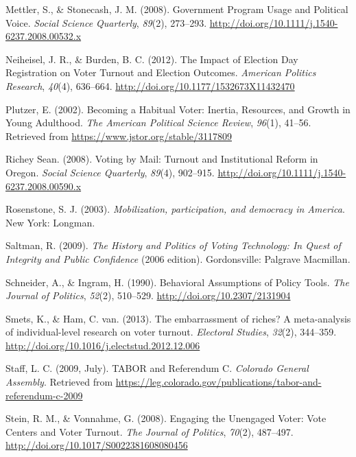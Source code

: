 \documentclass[12pt,twoside]{reedthesis}
\begin{document}
  \hypertarget{ref-mettler_government_2008}{}
  Mettler, S., \& Stonecash, J. M. (2008). Government Program Usage and
  Political Voice. \emph{Social Science Quarterly}, \emph{89}(2),
  273--293. \url{http://doi.org/10.1111/j.1540-6237.2008.00532.x}
  
  \hypertarget{ref-neiheisel_impact_2012}{}
  Neiheisel, J. R., \& Burden, B. C. (2012). The Impact of Election Day
  Registration on Voter Turnout and Election Outcomes. \emph{American
  Politics Research}, \emph{40}(4), 636--664.
  \url{http://doi.org/10.1177/1532673X11432470}
  
  \hypertarget{ref-plutzer_becoming_2002}{}
  Plutzer, E. (2002). Becoming a Habitual Voter: Inertia, Resources, and
  Growth in Young Adulthood. \emph{The American Political Science Review},
  \emph{96}(1), 41--56. Retrieved from
  \url{https://www.jstor.org/stable/3117809}
  
  \hypertarget{ref-richey_sean_voting_2008}{}
  Richey Sean. (2008). Voting by Mail: Turnout and Institutional Reform in
  Oregon. \emph{Social Science Quarterly}, \emph{89}(4), 902--915.
  \url{http://doi.org/10.1111/j.1540-6237.2008.00590.x}
  
  \hypertarget{ref-rosenstone_mobilization_2003}{}
  Rosenstone, S. J. (2003). \emph{Mobilization, participation, and
  democracy in America}. New York: Longman.
  
  \hypertarget{ref-saltman_history_2009}{}
  Saltman, R. (2009). \emph{The History and Politics of Voting Technology:
  In Quest of Integrity and Public Confidence} (2006 edition).
  Gordonsville: Palgrave Macmillan.
  
  \hypertarget{ref-schneider_behavioral_1990}{}
  Schneider, A., \& Ingram, H. (1990). Behavioral Assumptions of Policy
  Tools. \emph{The Journal of Politics}, \emph{52}(2), 510--529.
  \url{http://doi.org/10.2307/2131904}
  
  \hypertarget{ref-smets_embarrassment_2013}{}
  Smets, K., \& Ham, C. van. (2013). The embarrassment of riches? A
  meta-analysis of individual-level research on voter turnout.
  \emph{Electoral Studies}, \emph{32}(2), 344--359.
  \url{http://doi.org/10.1016/j.electstud.2012.12.006}
  
  \hypertarget{ref-legislative_council_staff_tabor_2009}{}
  Staff, L. C. (2009, July). TABOR and Referendum C. \emph{Colorado
  General Assembly}. Retrieved from
  \url{https://leg.colorado.gov/publications/tabor-and-referendum-c-2009}
  
  \hypertarget{ref-stein_engaging_2008}{}
  Stein, R. M., \& Vonnahme, G. (2008). Engaging the Unengaged Voter: Vote
  Centers and Voter Turnout. \emph{The Journal of Politics}, \emph{70}(2),
  487--497. \url{http://doi.org/10.1017/S0022381608080456}
  
\end{document}
